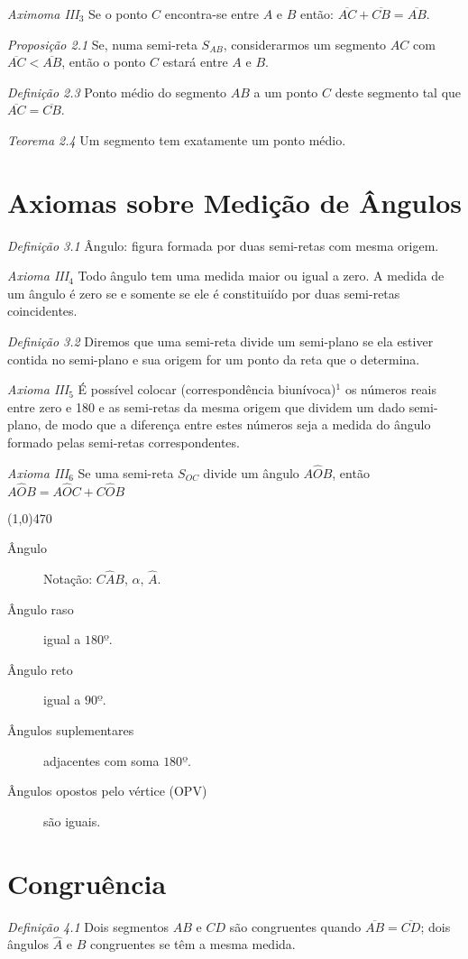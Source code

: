\documentclass[11pt]{article}
\begin{document}
\emph{Aximoma III$_{3}$} Se o ponto $C$ encontra-se entre $A$ e $B$ então:
$\overline{AC} + \overline{CB} = \overline{AB}$.

\emph{Proposição 2.1} Se, numa semi-reta $S_{AB}$, considerarmos um segmento
$AC$ com $\overline{AC} < \overline{AB}$, então o ponto $C$ estará entre $A$ e
$B$.

\emph{Definição 2.3} Ponto médio do segmento $AB$ a um ponto $C$ deste segmento
tal que $\overline{AC} = \overline{CB}$.

\emph{Teorema 2.4} Um segmento tem exatamente um ponto médio.

\section{Axiomas sobre Medição de Ângulos}

\emph{Definição 3.1} Ângulo: figura formada por duas semi-retas com mesma
origem.

\emph{Axioma III$_{4}$} Todo ângulo tem uma medida maior ou igual a zero. A
medida de um ângulo é zero se e somente se ele é constituiído por duas
semi-retas coincidentes.

\emph{Definição 3.2} Diremos que uma semi-reta divide um semi-plano se ela
estiver contida no semi-plano e sua origem for um ponto da reta que o
determina.

\emph{Axioma III$_{5}$} É possível colocar (correspondência
biunívoca)$^1$ os números reais entre zero e 180 e as
semi-retas da mesma origem que dividem um dado semi-plano, de modo que a
diferença entre estes números seja a medida do ângulo formado pelas semi-retas
correspondentes.

\emph{Axioma III$_6$} Se uma semi-reta $S_{OC}$ divide um ângulo $A\hat{O}B$,
então $A\hat{O}B = A\hat{O}C + C\hat{O}B$

\line(1,0){470}

\begin{description}
  \item[Ângulo] Notação: $C\hat{A}B$, $\alpha$, $\hat{A}$.
  \item[Ângulo raso] igual a $180º$.
  \item[Ângulo reto] igual a $90º$.
  \item[Ângulos suplementares] adjacentes com soma $180º$.
  \item[Ângulos opostos pelo vértice (OPV)] são iguais.
\end{description}

\section{Congruência}

\emph{Definição 4.1} Dois segmentos $AB$ e $CD$ são congruentes quando
$\overline{AB} = \overline{CD}$; dois ângulos $\hat{A}$ e $\hat{B}$ congruentes
se têm a mesma medida.
\end{document}

